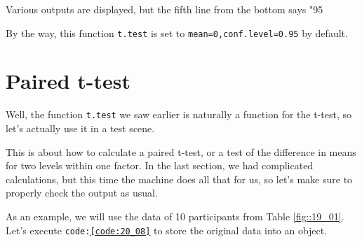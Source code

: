 \documentclass{ltjsbook}
\begin{document}

Various outputs are displayed, but the fifth line from the bottom says "95%

By the way, this function \texttt{t.test} is set to \texttt{mean=0,conf.level=0.95} by default.

\section{Paired t-test}
Well, the function \texttt{t.test} we saw earlier is naturally a function for the t-test, so let's actually use it in a test scene.

This is about how to calculate a paired t-test, or a test of the difference in means for two levels within one factor. In the last section, we had complicated calculations, but this time the machine does all that for us, so let's make sure to properly check the output as usual.

As an example, we will use the data of 10 participants from Table \ref{fig::19_01}. Let's execute \texttt{code:\ref{code:20_08}} to store the original data into an object.


\end{document}
